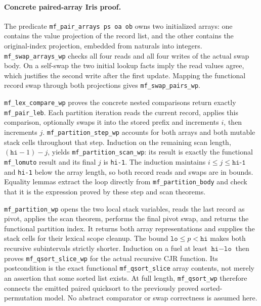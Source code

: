 \paragraph{Concrete paired-array Iris proof.}
The predicate \texttt{mf\_pair\_arrays ps oa ob} owns two initialized arrays:
one contains the value projection of the record list, and the other
contains the original-index projection, embedded from naturals into
integers. \texttt{mf\_swap\_arrays\_wp} checks all four reads and all four
writes of the actual swap body. On a self-swap the two initial lookup
facts imply the read values agree, which justifies the second write after
the first update. Mapping the functional record swap through both
projections gives \texttt{mf\_swap\_pairs\_wp}.

\texttt{mf\_lex\_compare\_wp} proves the concrete nested comparisons return
exactly \texttt{mf\_pair\_leb}. Each partition iteration reads the current
record, applies this comparison, optionally swaps it into the stored
prefix and increments $i$, then increments $j$.
\texttt{mf\_partition\_step\_wp} accounts for both arrays and both mutable
stack cells throughout that step. Induction on the remaining scan length,
$(\texttt{hi}-1)-j$, yields \texttt{mf\_partition\_scan\_wp}: its result is
exactly the functional \texttt{mf\_lomuto} result and its final $j$ is
\texttt{hi-1}. The induction maintains $i\leq j\leq\texttt{hi-1}$ and
\texttt{hi-1} below the array length, so both record reads and swaps are
in bounds. Equality lemmas extract the loop directly from
\texttt{mf\_partition\_body} and check that it is the expression proved by
these step and scan theorems.

\texttt{mf\_partition\_wp} opens the two local stack variables, reads the
last record as pivot, applies the scan theorem, performs the final pivot
swap, and returns the functional partition index. It returns both array
representations and supplies the stack cells for their lexical scope
cleanup. The bound $\texttt{lo}\leq p<\texttt{hi}$ makes both recursive
subintervals strictly shorter. Induction on a fuel at least
$\texttt{hi}-\texttt{lo}$ then proves \texttt{mf\_qsort\_slice\_wp} for the
actual recursive CJR function. Its postcondition is the exact functional
\texttt{mf\_qsort\_slice} array contents, not merely an assertion that some
sorted list exists. At full length, \texttt{mf\_qsort\_wp} therefore connects
the emitted paired quicksort to the previously proved sorted-permutation
model. No abstract comparator or swap correctness is assumed here.

